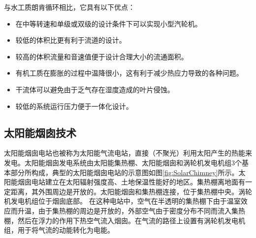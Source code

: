 与水工质朗肯循环相比，它具有以下优点：
\begin{itemize}
	\item 在中等转速和单级或双级的设计条件下可以实现小型汽轮机。
    \item 较低的体积比更有利于流道的设计。
    \item 较高的体积流量和音速值便于设计合理大小的流通面积。
    \item 有机工质在膨胀的过程中温降很小，这有利于减少热应力导致的各种问题。
	\item 干流体可以避免由于乏气存在湿度造成的叶片侵蚀。
	\item 较低的系统运行压力便于一体化设计。
  \end{itemize}

\subsection{太阳能烟囱技术}
\label{sec:sc}
太阳能烟囱电站也被称为太阳能气流电站，直接（不聚光）利用太阳产生的热能来发电。太阳能烟囱发电系统由太阳能集热棚、太阳能烟囱和涡轮机发电机组3个基本部分所构成，典型的太阳能烟囱电站的示意图如图\ref{fig:SolarChimney}所示。太阳能烟囱电站建立在太阳辐射强度高、土地保温性能好的地区。集热棚离地面有一定距离，其外围周边是开放的。太阳能烟囱和集热棚连接，位于集热棚中央。涡轮机发电机组位于烟囱底部。
在这种电站中，空气在半透明的集热棚下由于温室效应而升温，由于集热棚的周边是开放的，外部空气由于密度分布不同而流入集热棚，然后在浮力的作用下热空气流入烟囱。在气流的路径上设置有涡轮机发电机组，用于将气流的动能转化为电能。

